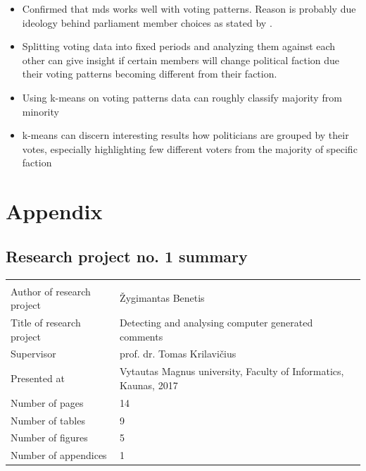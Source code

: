 \documentclass[a4paper,12pt]{article}
\begin{document}
   	
   	\begin{itemize}
    	\item Confirmed that \acrfull{mds} works well with voting patterns. Reason is probably due ideology behind parliament member choices as stated by \cite{poole_2005}.
    	\item Splitting voting data into fixed periods and analyzing them against each other can give insight if certain members will change political faction due their voting patterns becoming different from their faction.
    	\item Using \gls{k-means} on voting patterns data can roughly classify majority from minority
    	\item \gls{k-means} can discern interesting results how politicians are grouped by their votes, especially highlighting few different voters from the majority of specific faction
    \end{itemize}
   
    \clearpage
    
    {}
    
        
    \clearpage
    
      
	\appendix
	\section{Appendix}
	
	\subsection{Research project no. 1 summary}
	

	   		\noindent
	\begin{center}
		\begin{tabular}{L{4.5cm} L{8cm}}
			\\ 
			Author of research project & Žygimantas Benetis \\
			Title of research project & Detecting and analysing computer generated comments\\
			Supervisor & prof. dr. Tomas Krilavičius\\
			Presented at & Vytautas Magnus university, Faculty of Informatics, Kaunas, 2017\\
			Number of pages & 14\\
			Number of tables & 9\\
			Number of figures & 5\\
			Number of appendices & 1\\
		\end{tabular}
	\end{center} 
	
\end{document}
